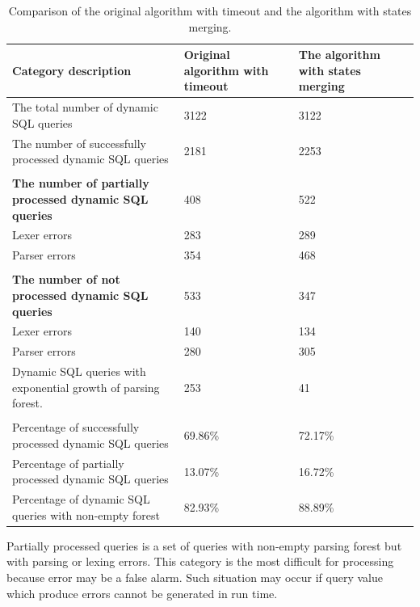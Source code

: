 \documentclass{llncs}
\begin{document}
\begin{center}
\begin{table}
\caption{Comparison of the original algorithm with timeout and the algorithm with states merging.}
\begin{tabular}[c c c]{| p{5.5cm} | p{3cm} | p{3cm} |}
\hline
Category description & Original algorithm with timeout & The algorithm with states merging
\\
\hline
The total number of dynamic SQL queries & 3122 & 3122
\\
\hline
The number of successfully processed dynamic SQL queries & 2181 & 2253
\\
\hline
 & &
\\
\hline
\bfseries{The number of partially processed dynamic SQL queries} & 408 & 522
\\
\hline

 Lexer errors & 283 & 289
\\
\hline

 Parser errors & 354 & 468
\\
\hline
 & &
\\
\hline

\bfseries{The number of not processed dynamic SQL queries} & 533 & 347
\\
\hline
  Lexer errors & 140 & 134
\\
\hline

 Parser errors & 280 & 305
\\
\hline

 Dynamic SQL queries with exponential growth of parsing forest. & 253 & 41

\\
\hline
 & &
\\
\hline


Percentage of successfully processed dynamic SQL queries & 69.86\% & 72.17\%
\\
\hline

Percentage of partially processed dynamic SQL queries & 13.07\% & 16.72\%
\\
\hline

Percentage of dynamic SQL queries with non-empty forest & 82.93\% & 88.89\%
\\
\hline
 
\end{tabular}
\end{table}
\end{center}


Partially processed queries is a set of queries with non-empty parsing forest but with parsing or lexing errors. This category is the most difficult for processing because error may be a false alarm. Such situation may occur if query value which produce errors cannot be generated in run time.
\end{document}
